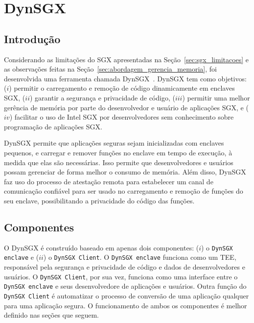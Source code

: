 \chapter{DynSGX}
\label{chapter:dynsgx}

\section{Introdução}
\label{sec:dynsgx_intro}

Considerando as limitações do SGX apresentadas na Seção~\ref{sec:sgx_limitacoes}
e as observações feitas na Seção~\ref{sec:abordagem_gerencia_memoria}, foi desenvolvida uma ferramenta chamada
DynSGX~\cite{DynSGXCloudCom2017}. DynSGX tem como objetivos: ($i$) permitir o
carregamento e remoção de código dinamicamente em enclaves SGX, ($ii$) garantir
a segurança e privacidade de código, ($iii$) permitir uma melhor gerência de
memória por parte do desenvolvedor e usuário de aplicações SGX, e ($iv$)
facilitar o uso de Intel SGX por desenvolvedores sem conhecimento sobre
programação de aplicações SGX.

DynSGX permite que aplicações seguras sejam inicializadas com enclaves pequenos,
e carregar e remover funções no enclave em tempo de execução, à medida que elas
são necessárias. Isso permite que desenvolvedores e usuários possam gerenciar de
forma melhor o consumo de memória. Além disso, DynSGX faz uso do processo de
atestação remota para estabelecer um canal de comunicação confiável para ser
usado no carregamento e remoção de funções do seu enclave, possibilitando a
privacidade do código das funções.

\section{Componentes}
\label{sec:dynsgx_componentes}

O DynSGX é construído baseado em apenas dois componentes: ($i$) o \texttt{DynSGX
enclave} e ($ii$) o \texttt{DynSGX Client}. O \texttt{DynSGX enclave} funciona
como um TEE, responsável pela segurança e privacidade de código e dados de
desenvolvedores e usuários. O \texttt{DynSGX Client}, por sua vez, funciona como
uma interface entre o \texttt{DynSGX enclave} e seus desenvolvedore de
aplicações e usuários. Outra função do \texttt{DynSGX Client} é automatizar o
processo de conversão de uma aplicação qualquer para uma aplicação segura.
O funcionamento de ambos os componentes é melhor definido nas seções que seguem.

